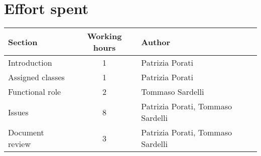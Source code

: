 \pagebreak
\section{Effort spent}

	\begin{center}
		\begin{tabular}{ l c l } 
			\hline
			\textbf{Section} 	& \textbf{Working hours} 	& \textbf{Author} \\ 
			\hline
			Introduction 	& 1 	& Patrizia Porati \\
			Assigned classes	 	& 1 	& Patrizia Porati \\
			Functional role 	& 2 	& Tommaso Sardelli \\ 
			Issues 	& 8 	& Patrizia Porati, Tommaso Sardelli \\
			Document review 	& 3 	& Patrizia Porati, Tommaso Sardelli \\
			\hline
		\end{tabular}
		\vspace{0.4cm}
	\end{center}
